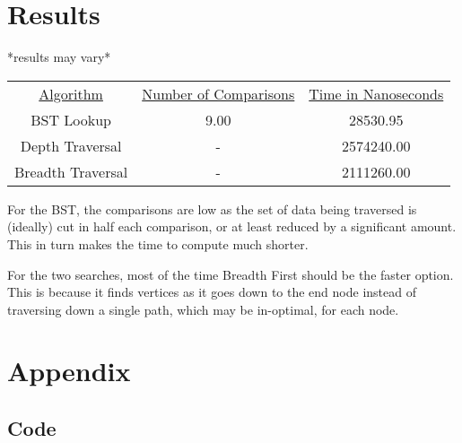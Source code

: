 \documentclass[10pt]{article}
\begin{document}
\section{Results}
*results may vary*
\begin{center}
\begin{tabular}{ |c|c|c| } 
 \hline
 \underline{Algorithm} & \underline{Number of Comparisons} & \underline{Time in Nanoseconds} \\
 BST Lookup     & 9.00 & 28530.95 \\ 
 Depth Traversal      & - & 2574240.00 \\ 
 Breadth Traversal     & - & 2111260.00 \\ 
 \hline
\end{tabular}
\end{center}
For the BST, the comparisons are low as the set of data being traversed is (ideally) cut in half each comparison, or at least reduced by a significant amount. This in turn makes the time to compute much shorter.

\newline

For the two searches, most of the time Breadth First should be the faster option. This is because it finds vertices as it goes down to the end node instead of traversing down a single path, which may be in-optimal, for each node.


 



\section{Appendix}

\subsection{Code}
\end{document}

